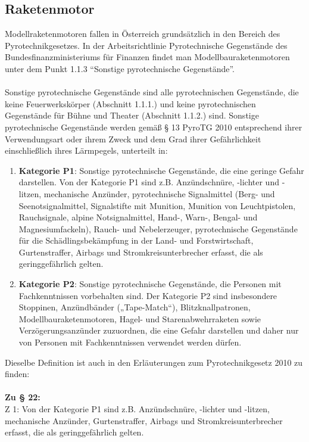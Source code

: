 \subsection{Raketenmotor}
\label{subsec:rocket_motor_legal}
Modellraketenmotoren fallen in Österreich grundsätzlich in den Bereich des Pyrotechnikgesetzes. In der Arbeitsrichtlinie Pyrotechnische Gegenstände des Bundesfinanzministeriums für Finanzen findet man Modellbauraketenmotoren unter dem Punkt 1.1.3 "`Sonstige pyrotechnische Gegenstände"'.
\\
\\
Sonstige pyrotechnische Gegenstände sind alle pyrotechnischen Gegenstände, die keine Feuerwerkskörper (Abschnitt 1.1.1.) und keine pyrotechnischen Gegenstände für Bühne und Theater (Abschnitt 1.1.2.) sind. Sonstige pyrotechnische Gegenstände werden gemäß § 13 PyroTG 2010 entsprechend ihrer Verwendungsart oder ihrem Zweck und dem Grad ihrer Gefährlichkeit einschließlich ihres Lärmpegels, unterteilt in:
\begin{enumerate}
    \item \textbf{Kategorie P1}: Sonstige pyrotechnische Gegenstände, die eine geringe Gefahr darstellen. Von der Kategorie P1 sind z.B. Anzündschnüre, -lichter und -litzen, mechanische Anzünder, pyrotechnische Signalmittel (Berg- und Seenotsignalmittel, Signalstifte mit Munition, Munition von Leuchtpistolen, Rauchsignale, alpine Notsignalmittel, Hand-, Warn-, Bengal- und Magnesiumfackeln), Rauch- und Nebelerzeuger, pyrotechnische Gegenstände für die Schädlingsbekämpfung in der Land- und Forstwirtschaft, Gurtenstraffer, Airbags und Stromkreisunterbrecher erfasst, die als geringgefährlich gelten.
    \item \textbf{Kategorie P2}: Sonstige pyrotechnische Gegenstände, die Personen mit Fachkenntnissen vorbehalten sind. Der Kategorie P2 sind insbesondere Stoppinen, Anzündbänder („Tape-Match“), Blitzknallpatronen, Modellbauraketenmotoren, Hagel- und Starenabwehrraketen sowie Verzögerungsanzünder zuzuordnen, die eine Gefahr darstellen und daher nur von Personen mit Fachkenntnissen verwendet werden dürfen. \parencite{BMF_Pyro}
\end{enumerate} 
\vspace{0.5cm}
Dieselbe Definition ist auch in den Erläuterungen zum Pyrotechnikgesetz 2010 zu finden:
\\
\\
\textbf{Zu § 22:} \\
Z 1: Von der Kategorie P1 sind z.B. Anzündschnüre, -lichter und -litzen, mechanische Anzünder, Gurtenstraffer, Airbags und Stromkreisunterbrecher erfasst, die als geringgefährlich gelten. \\

